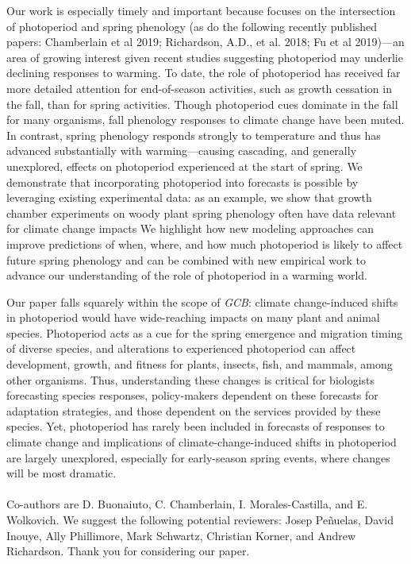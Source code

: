 \documentclass[10.7pt,a4paper]{letter} %
\begin{document}
\begin{letter}{}
Our work is especially timely and important because focuses on the intersection of photoperiod and spring phenology (as do the following recently published papers: Chamberlain et al 2019; Richardson, A.D., et al. 2018; Fu et al 2019)---an area of growing interest given recent studies suggesting photoperiod may underlie declining responses to warming. To date, the role of photoperiod has received far more detailed attention for end-of-season activities, such as growth cessation in the fall, than for spring activities. Though photoperiod cues dominate in the fall for many organisms, fall phenology responses to climate change have been muted. In contrast, spring phenology responds strongly to temperature and thus has advanced substantially with warming---causing cascading, and generally unexplored, effects on photoperiod experienced at the start of spring. We demonstrate that incorporating photoperiod into forecasts is possible by leveraging existing experimental data: as an example, we show that growth chamber experiments on woody plant spring phenology often have data relevant for climate change impacts %
We highlight how new modeling approaches can improve predictions of when, where, and how much photoperiod is likely to affect future spring phenology and can be combined with new empirical work to advance our understanding of the role of photoperiod in a warming world. %

Our paper falls squarely within the scope of \emph{GCB}: climate change-induced shifts in photoperiod would have wide-reaching impacts on many plant and animal species. Photoperiod acts as a cue for the spring emergence and migration timing of diverse species, and alterations to experienced photoperiod can affect development, growth, and fitness for plants, insects, fish, and mammals, among other organisms. Thus, understanding these changes is critical for biologists forecasting species responses, policy-makers dependent on these forecasts for adaptation strategies, and those dependent on the services provided by these species. Yet, photoperiod has rarely been included in forecasts of responses to climate change and implications of climate-change-induced shifts in photoperiod are largely unexplored, especially for early-season spring events, where changes will be most dramatic. 
\\
\\
Co-authors are D. Buonaiuto, C. Chamberlain, I. Morales-Castilla, and E. Wolkovich. We suggest the following potential reviewers: Josep Pe\~nuelas, David Inouye, Ally Phillimore, Mark Schwartz, Christian Korner, and Andrew Richardson.
Thank you for considering our paper.


\end{letter}
\end{document}
